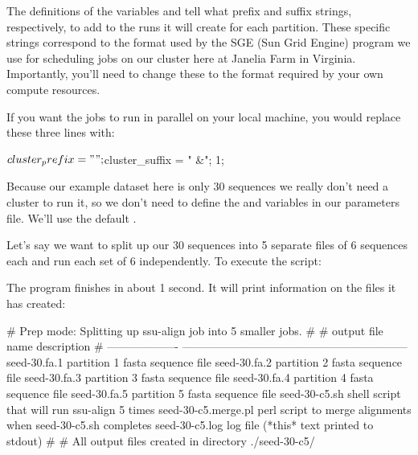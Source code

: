 The definitions of the variables  and
 tell  what prefix and suffix
strings, respectively, to add to the  runs it will
create for each partition. These specific strings correspond to the
format used by the SGE (Sun Grid Engine)  program we use
for scheduling jobs on our cluster here at Janelia Farm in Virginia.
Importantly, you'll need to change these to the format required by
your own compute resources.

If you want the jobs to run in parallel on your local machine, you
would replace these three lines with:
\begin{sreoutput}
$cluster_prefix = "";
$cluster_suffix = " &";
1;
\end{sreoutput}

Because our example dataset here is only 30 sequences we really don't
need a cluster to run it, so we don't need to define the
 and  variables in our
parameters file. We'll use the default .

Let's say we want to split up our 30 sequences into 5 separate files
of 6 sequences each and run each set of 6 independently. 
To execute the script:


The program finishes in about 1 second. It will print information on
the files it has created:

\newpage

\begin{comment}
# ssu-align :: define and align SSU rRNA sequences
# SSU-ALIGN 0.1 (June 2009)
# Copyright (C) 2009 HHMI Janelia Farm Research Campus
# Freely distributed under the GNU General Public License (GPLv3)
# - - - - - - - - - - - - - - - - - - - - - - - - - - - - - - - - - - - -
# command: ssu-align -c 5 ssu3-0p1.cm seed-30.fa seed-30-c5 sa-0p1.params
# date:    Wed Aug 19 18:57:15 2009
#
\end{comment}
\begin{sreoutput}
# Prep mode: Splitting up ssu-align job into 5 smaller jobs.
#
# output file name     description                                                 
# -------------------  ------------------------------------------------------------
  seed-30.fa.1         partition 1 fasta sequence file
  seed-30.fa.2         partition 2 fasta sequence file
  seed-30.fa.3         partition 3 fasta sequence file
  seed-30.fa.4         partition 4 fasta sequence file
  seed-30.fa.5         partition 5 fasta sequence file
  seed-30-c5.sh        shell script that will run ssu-align 5 times
  seed-30-c5.merge.pl  perl script to merge alignments when seed-30-c5.sh completes
  seed-30-c5.log       log file (*this* text printed to stdout)
#
# All output files created in directory ./seed-30-c5/
\end{sreoutput}

